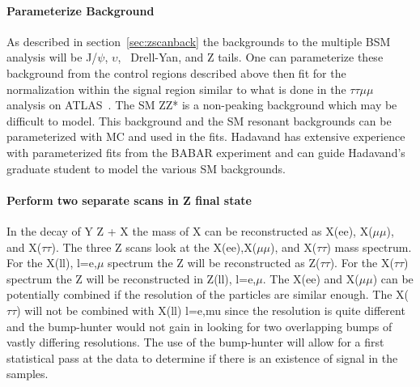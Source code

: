 \paragraph{Parameterize Background} %
As described in section~\ref{sec:zscanback} the backgrounds to the multiple BSM analysis  will be J/$\psi$, $\upsilon$, \ttbar\, Drell-Yan, and Z tails.  One can 
parameterize these background from the control regions described above then fit for the normalization within the signal region similar to what is done in the
$\tau\tau \mu \mu$ analysis on ATLAS~\cite{tautaumumu}.  The SM ZZ* is a non-peaking background which may be difficult to model. This background and the SM resonant backgrounds 
can be parameterized with MC and used in the fits. Hadavand has extensive experience with parameterized fits from the BABAR experiment and can guide Hadavand's graduate student to model the various SM backgrounds.

\paragraph{Perform two separate scans in Z final state} %
In the decay of Y \too Z + X the mass of X can be reconstructed as X(ee), X($\mu\mu$), and X($\tau\tau$).  
The three Z scans look at the X(ee),X($\mu\mu$), and X($\tau\tau$) mass spectrum. For the X(ll), l=e,$\mu$ spectrum the Z will be reconstructed as Z($\tau\tau$).  For the X($\tau\tau$) spectrum the Z will be reconstructed in Z(ll), l=e,$\mu$.  
The X(ee) and X($\mu\mu$) can be potentially combined if the resolution of the particles are similar enough.  The X($\tau\tau$) will not be combined with X(ll) l=e,mu since the resolution is quite different and the bump-hunter would not gain in looking for two overlapping bumps of vastly differing resolutions.
The use of the bump-hunter will allow for a first statistical pass at the data to determine if there is an existence of signal in the samples.  



